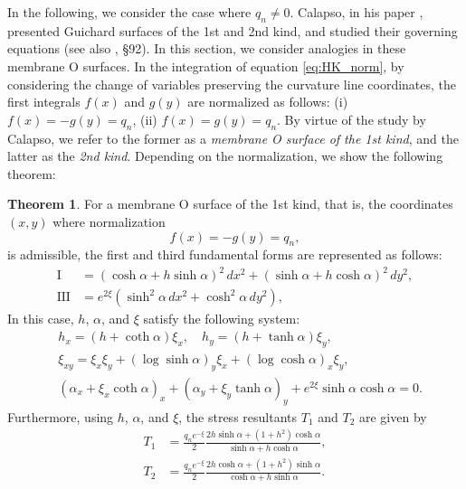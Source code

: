 \documentclass[a4paper]{amsart}
\newcommand{\first}{\operatorname{I}}
\newcommand{\third}{\operatorname{III}}
\theoremstyle{definition}
\newtheorem{thm}{Theorem}[section]
\begin{document}
In the following, we consider the case where $q_n \neq 0$.
Calapso, in his paper \cite{Calapso}, presented Guichard surfaces of the 1st and 2nd kind, and studied their governing equations (see also \cite{eisenhart_transformation}, \S 92).
In this section, we consider analogies in these membrane O surfaces.
In the integration of equation \eqref{eq:HK_norm}, by considering the change of variables preserving the curvature line coordinates, the first integrals $f(x)$ and $g(y)$ are normalized as follows:
(i) $f(x) = - g(y) = q_n$, (ii) $f(x) = g(y) = q_n$.
By virtue of the study by Calapso, we refer to the former as a \textit{membrane O surface of the 1st kind}, and the latter as the \textit{2nd kind}.
Depending on the normalization, we show the following theorem:
%
\begin{thm}
\label{thm:main1_1st}
For a membrane O surface of the 1st kind, that is, the coordinates $(x, y)$ where normalization
\begin{equation}
f(x) = - g(y) = q_n,
\end{equation}
is admissible, the first and third fundamental forms are represented as follows:
\begin{equation}
\begin{aligned}
\first &= (\cosh \alpha + h \sinh \alpha)^2 \, dx^2 + (\sinh \alpha + h \cosh \alpha)^2 \, dy^2,\\
\third &= e^{2\xi} (\sinh^2 \alpha \, dx^2 + \cosh^2 \alpha \, dy^2),
\end{aligned}
\end{equation}
In this case, $h$, $\alpha$, and $\xi$ satisfy the following system:
\begin{equation}
\label{eq:1st_govern}
\begin{aligned}
&h_x = (h + \coth \alpha) \xi_x, \quad 
h_y = (h + \tanh \alpha) \xi_y,\\
&\xi_{xy} = \xi_x \xi_y + (\log \sinh \alpha)_y \xi_x + (\log \cosh \alpha)_x \xi_y,\\
&(\alpha_x + \xi_x \coth \alpha)_x 
+ (\alpha_y + \xi_y \tanh \alpha)_y
+ e^{2\xi} \sinh \alpha \cosh \alpha = 0.
\end{aligned}
\end{equation}
Furthermore, using $h$, $\alpha$, and $\xi$, the stress resultants $T_1$ and $T_2$ are given by
\begin{equation}
\label{eq:1st_stress}
\begin{aligned}
T_1 
&= \frac{q_ne^{-\xi}}{2} \frac{2h \sinh \alpha + (1+h^2)\cosh \alpha}{\sinh \alpha + h \cosh \alpha},\\
T_2
&= \frac{q_ne^{-\xi}}{2} \frac{2h \cosh \alpha + (1+h^2)\sinh \alpha}{\cosh \alpha + h \sinh \alpha}.
\end{aligned}
\end{equation}
\end{thm}
\end{document}

